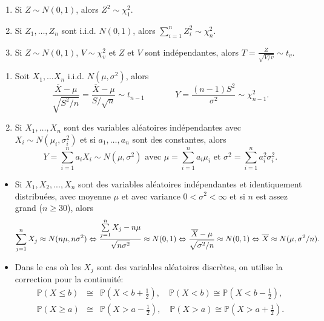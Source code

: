 \documentclass [12pt]{article}
\begin{document}
\vspace{0.05 in}
\begin{enumerate}
\item[$\bullet$] Si $Z \sim N(0,1)$, alors $Z^2 \sim \chi^2_1$. 
\item[$\bullet$] Si $Z_1, \ldots, Z_n$ sont i.i.d. $N(0,1)$, alors $\sum_{i=1}^n Z_i^2 \sim \chi^2_n$.
\item[$\bullet$] Si $Z \sim N(0,1)$, $V \sim \chi^2_v$ et $Z$ et $V$ sont indépendantes, alors $ T = \frac{Z}{\sqrt{V/v}} \sim t_v$.
\end{enumerate}

\newpage
\begin{enumerate}
\item[$\bullet$] Soit $X_1, \ldots X_n$  i.i.d. $N(\mu, \sigma^2)$, alors $$\frac{\overline{X} - \mu}{\sqrt{S^2 / n}} = \frac{\overline{X} - \mu}{S / \sqrt{n}} \sim t_{n-1} \;\;\;\;\;\;\;\;\;\;\;\;\; Y = \frac{(n-1)S^2}{\sigma^2} \sim \chi^2_{n-1}.$$
\item[$\bullet$] Si $X_1,\ldots,X_n$ sont des variables aléatoires indépendantes
avec $X_i\sim N(\mu_i,\sigma^2_i)$ et si $a_1,\ldots,a_n$ sont des constantes,
alors $$Y=\sum_{i=1}^na_iX_i\sim N(\mu,\sigma^2) \mbox{ avec } \mu=\sum_{i=1}^na_i\mu_i \mbox{ et }\sigma^2=\sum_{i=1}^na_i^2\sigma_i^2.$$
\end{enumerate}



\vspace{0.1in}
\begin{itemize}
\item
Si $X_1, X_2,..., X_n$ sont des variables aléatoires
indépendantes et identiquement distribuées, avec moyenne $\mu$
et avec variance $0 < \sigma^2 < \infty$ et si $n$ est assez grand
($n\ge  30$), alors
$$
\sum\limits_{j=1}^n X_j\approx N(n\mu, n\sigma^2) \Leftrightarrow
{\sum\limits_{j=1}^n X_j-n\mu\over\sqrt{n\sigma^2}}\approx N(0,1)
\Leftrightarrow
{\overline{X}-\mu\over\sqrt{\sigma^2/n}}\approx N(0,1)
\Leftrightarrow
\overline{X}\approx N(\mu,\sigma^2/n).
$$
\item
Dans le cas où les $X_j$ sont des variables aléatoires
discrètes, on utilise la correction pour la continuité:
\begin{eqnarray*}
{\mathbb P}(X \leq b) &\cong& {\mathbb P}\left(X < b+\frac12\right), \quad {\mathbb
P}(X < b) \cong {\mathbb P}\left(X < b - \frac12\right), \\ {\mathbb P}(X \geq a) &\cong& {\mathbb P}\left(X
> a-\frac12\right), \quad {\mathbb P}(X > a) \cong {\mathbb P}\left(X > a+\frac12\right).
\end{eqnarray*}
\end{itemize}
\end{document}
